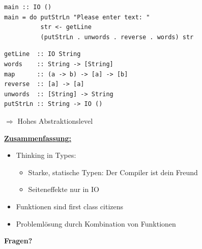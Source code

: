 \documentclass[unknownkeysallowed]{beamer}
\begin{document}
  \begin{frame}[fragile]

  \begin{verbatim}
main :: IO ()
main = do putStrLn "Please enter text: "
          str <- getLine
          (putStrLn . unwords . reverse . words) str
  \end{verbatim}
  
\pause

  \begin{verbatim}
getLine  :: IO String
words    :: String -> [String]
map      :: (a -> b) -> [a] -> [b]
reverse  :: [a] -> [a]
unwords  :: [String] -> String
putStrLn :: String -> IO ()
  \end{verbatim}
\bigskip 
\pause

$\Rightarrow$ Hohes Abstraktionslevel


\end{frame}



\begin{frame}

\Large\textbf{\underline{Zusammenfassung:}}\bigskip\normalsize

\begin{itemize}
\item Thinking in Types: \pause
      \begin{itemize}
      \item Starke, statische Typen: Der Compiler ist dein Freund \pause
      \item Seiteneffekte nur in IO \pause
      \end{itemize}
\item Funktionen sind \glqq first class citizens\grqq \pause
\item Problemlösung durch Kombination von Funktionen  \pause
\end{itemize}
  
\end{frame}



\begin{frame}

\begin{center}
\Large\textbf{Fragen?}
\end{center}

\end{frame}
  
\end{document}
